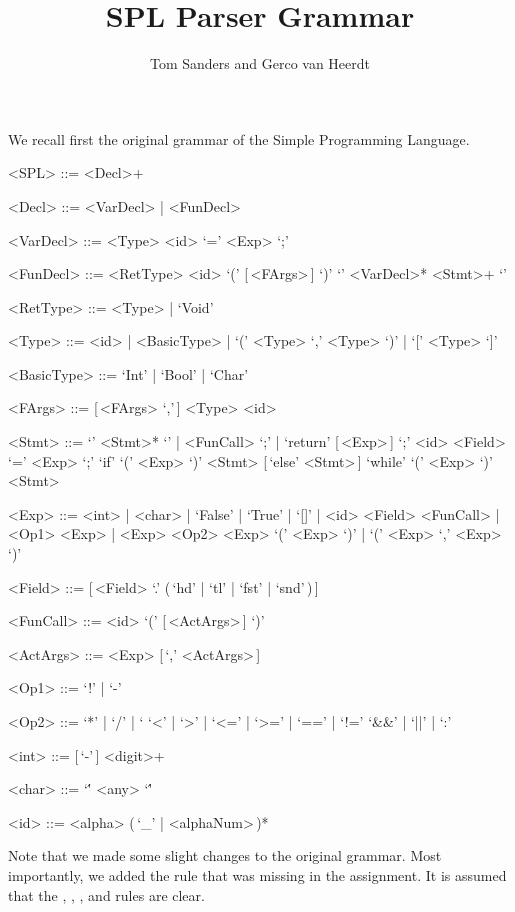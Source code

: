 \documentclass{article}
\title{SPL Parser Grammar}
\author{Tom Sanders and Gerco van Heerdt}
\begin{document}
\maketitle

We recall first the original grammar of the Simple Programming Language.
\setlength{\grammarindent}{6.8em}
\begin{grammar}
    <SPL> ::= <Decl>+

    <Decl> ::= <VarDecl> | <FunDecl>

    <VarDecl> ::= <Type> <id> `=' <Exp> `;'

    <FunDecl> ::= <RetType> <id> `(' [\,<FArgs>\,] `)' `{' <VarDecl>* <Stmt>+ `}'

    <RetType> ::= <Type> | `Void'

    <Type> ::= <id> | <BasicType> | `(' <Type> `,' <Type> `)' | `[' <Type> `]'

    <BasicType> ::= `Int' | `Bool' | `Char'

    <FArgs> ::= [\,<FArgs> `,'\,] <Type> <id>

    <Stmt> ::= `{' <Stmt>* `}' | <FunCall> `;' | `return' [\,<Exp>\,] `;'
    \alt <id> <Field> `=' <Exp> `;'
    \alt `if' `(' <Exp> `)' <Stmt> [\,`else' <Stmt>\,]
    \alt `while' `(' <Exp> `)' <Stmt>

    <Exp> ::= <int> | <char> | `False' | `True' | `[]' | <id> <Field>
    \alt <FunCall> | <Op1> <Exp> | <Exp> <Op2> <Exp>
    \alt `(' <Exp> `)' | `(' <Exp> `,' <Exp> `)'

    <Field> ::= [\,<Field> `.' (\,`hd' | `tl' | `fst' | `snd'\,)\,]

    <FunCall> ::= <id> `(' [\,<ActArgs>\,] `)'

    <ActArgs> ::= <Exp> [\,`,' <ActArgs>\,]

    <Op1> ::= `!' | `-'

    <Op2> ::=  `*' | `/' | `%
    \alt `<' | `>' | `<=' | `>=' | `==' | `!='
    \alt `&&' | `||' | `:'

    <int> ::= [\,`-'\,] <digit>+

    <char> ::= `\'' <any> `\''

    <id> ::= <alpha> (\,`_' | <alphaNum>\,)*
\end{grammar}
Note that we made some slight changes to the original grammar.
Most importantly, we added the  rule that was missing in the assignment.
It is assumed that the , , , and  rules are clear.
\end{document}
